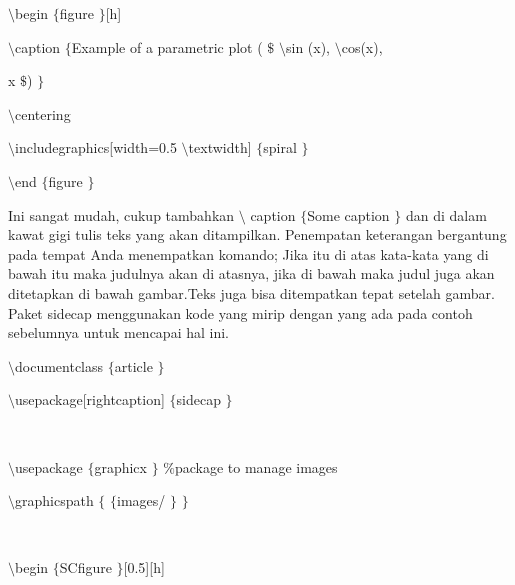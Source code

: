 \noindent 
 $  \setminus $begin $  \{  $figure $  \}  $[h] \par
\vspace{12pt}
\noindent 
 $  \setminus $caption $  \{  $Example of a parametric plot ( $  \$  $ $  \setminus $sin (x),  $  \setminus $cos(x), \par
\vspace{12pt}
\noindent 
 x $  \$  $) $  \}  $ \par
\vspace{12pt}
\noindent 
 $  \setminus $centering \par
\vspace{12pt}
\noindent 
 $  \setminus $includegraphics[width=0.5 $  \setminus $textwidth] $  \{  $spiral $  \}  $ \par
\vspace{12pt}
\noindent 
 $  \setminus $end $  \{  $figure $  \}  $ \par
\vspace{12pt}
\vspace{16pt}
\noindent 
 \hspace*{0.5in} Ini sangat mudah, cukup tambahkan  $  \setminus $ caption  $  \{  $Some caption $  \}  $ dan di dalam kawat gigi tulis teks yang akan ditampilkan. Penempatan keterangan bergantung pada tempat Anda menempatkan komando; Jika itu di atas kata-kata yang di bawah itu maka judulnya akan di atasnya, jika di bawah maka judul juga akan ditetapkan di bawah gambar.Teks juga bisa ditempatkan tepat setelah gambar. Paket sidecap menggunakan kode yang mirip dengan yang ada pada contoh sebelumnya untuk mencapai hal ini. \par
\vspace{16pt}
\vspace{16pt}
\noindent 
 $  \setminus $documentclass $  \{  $article $  \}  $ \par
\vspace{12pt}
\noindent 
 $  \setminus $usepackage[rightcaption] $  \{  $sidecap $  \}  $ \par
\noindent 
 $  $ \par
\noindent 
 $  \setminus $usepackage $  \{  $graphicx $  \}  $  $  \%  $package to manage images \par
\vspace{12pt}
\noindent 
 $  \setminus $graphicspath $  \{  $  $  \{  $images/ $  \}  $  $  \}  $ \par
\noindent 
 $  $ \par
\noindent 
 $  \setminus $begin $  \{  $SCfigure $  \}  $[0.5][h] \par
